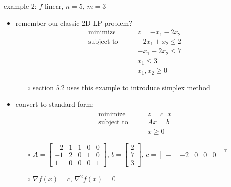 \documentclass[10pt,hyperref]{beamer}
\newcommand{\grad}{\nabla}
\newcommand{\ds}{\displaystyle}
\begin{document}
\begin{frame}{example 2: $f$ linear, $n=5$, $m=3$}

\begin{itemize}
\item remember our classic 2D LP problem?
\begin{equation*}
\begin{matrix}
\text{minimize} \qquad & z = -x_1 - 2x_2 \\
\text{subject to} \qquad & -2x_1 + x_2 \le 2 \\
 & -x_1 + 2x_2 \le 7 \\
 & x_1 \le 3 \\
 & x_1, x_2 \ge 0
\end{matrix}
\end{equation*}

    \begin{itemize}
    \item[$\circ$] section 5.2 uses this example to introduce simplex method
    \end{itemize}

\medskip
\item convert to standard form:
\begin{equation*}
\begin{matrix}
\text{minimize} \qquad & z = c^\top x \\
\text{subject to} \qquad & A x = b \\
 & x \ge 0
\end{matrix}
\end{equation*}

    \begin{itemize}
    \item[$\circ$] $\ds A = \begin{bmatrix} -2 & 1 & 1 & 0 & 0 \\ -1 & 2 & 0 & 1 & 0 \\ 1 & 0 & 0 & 0 & 1 \end{bmatrix}$, $\ds b = \begin{bmatrix} 2 \\ 7 \\ 3 \end{bmatrix}$, $c = \begin{bmatrix} -1 & -2 & 0 & 0 & 0 \end{bmatrix}^\top$
    \item[$\circ$] $\grad f(x) = c$, \quad $\grad^2 f(x)=0$
    \end{itemize}
\end{itemize}
\end{frame}
\end{document}
